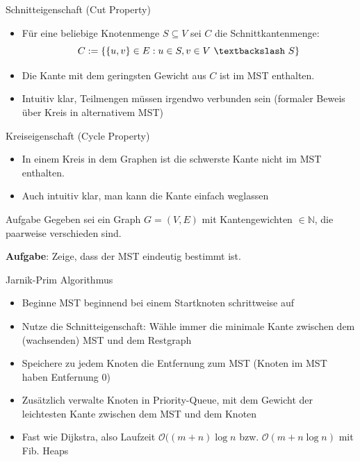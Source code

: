 \begin{frame}{Schnitteigenschaft (Cut Property)}
	\begin{itemize}
		\item Für eine beliebige Knotenmenge $S \subseteq V$ sei $C$ die Schnittkantenmenge:
		$$C := \{ \{u,v\} \in E: u \in S, v \in V \  \textbackslash \  S \}$$

		\item Die Kante mit dem geringsten Gewicht aus $C$ ist im MST enthalten.
		\item Intuitiv klar, Teilmengen müssen irgendwo verbunden sein (formaler Beweis über Kreis in alternativem MST)
	\end{itemize}
\end{frame}

\begin{frame}{Kreiseigenschaft (Cycle Property)}
	\begin{itemize}
		\item In einem Kreis in dem Graphen ist die schwerste Kante nicht im MST enthalten.
		\item Auch intuitiv klar, man kann die Kante einfach weglassen
	\end{itemize}
\end{frame}

\begin{frame}{Aufgabe}
	Gegeben sei ein Graph $G = (V, E)$ mit Kantengewichten $\in \mathbb{N}$, die paarweise verschieden sind.

	\textbf{Aufgabe}: Zeige, dass der MST eindeutig bestimmt ist.
\end{frame}

\begin{frame}{Jarnik-Prim Algorithmus}
	\begin{itemize}
		\item Beginne MST beginnend bei einem Startknoten schrittweise auf
		\item Nutze die Schnitteigenschaft: Wähle immer die minimale Kante zwischen dem (wachsenden) MST und dem Restgraph
		\item Speichere zu jedem Knoten die Entfernung zum MST (Knoten im MST haben Entfernung 0)
		\item Zusätzlich verwalte Knoten in Priority-Queue, mit dem Gewicht der leichtesten Kante zwischen dem MST und dem Knoten
		\item Fast wie Dijkstra, also Laufzeit $\mathcal{O}((m + n) \log{n}$ bzw. $\mathcal{O}(m + n \log{n})$ mit Fib. Heaps
	\end{itemize}
\end{frame}

